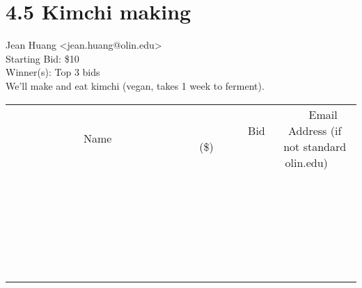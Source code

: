 \documentclass[11pt]{article}
\begin{document}
					\section*{4.5 Kimchi making}
					Jean Huang <jean.huang@olin.edu> \\
					Starting Bid: \$10 \\
					Winner(s): Top 3 bids \\
					We'll make and eat kimchi (vegan, takes 1 week to ferment). \\
					[6ex]
					\begin{tabular}{c c c}
						~~~~~~~~~~~~~Name~~~~~~~~~~~~~ & ~~~~~~~~~Bid (\$)~~~~~~~~~ & ~~~Email Address (if not standard olin.edu)~~~ \\
				
 & & \\
\hline
 & & \\
\hline
 & & \\
\hline
 & & \\
\hline
 & & \\
\hline
 & & \\
\hline
 & & \\
\hline
 & & \\
\hline
 & & \\
\hline
 & & \\
\hline
 & & \\
\hline
 & & \\
\hline
 & & \\
\hline
 & & \\
\hline
 & & \\
\hline
 & & \\
\hline
 & & \\
\hline
 & & \\
\hline
 & & \\
\hline
 & & \\
\hline
 & & \\
\hline
 & & \\
\hline
 & & \\
\hline
 & & \\
\hline
 & & \\
\hline
 & & \\
\hline
					\end{tabular}
					\clearpage
				
\end{document}
